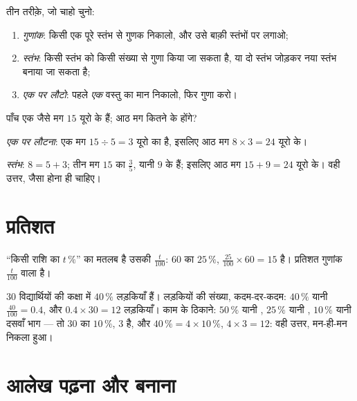\begin{method}[समानुपात की सारणी पूरी करना]\label{met:g6:propdata:complete}
तीन तरीक़े, जो चाहो चुनो:
\begin{enumerate}
  \item \emph{गुणांक}: किसी एक पूरे स्तंभ से गुणक निकालो, और उसे
        बाक़ी स्तंभों पर लगाओ;
  \item \emph{स्तंभ}: किसी स्तंभ को किसी संख्या से गुणा किया जा
        सकता है, या दो स्तंभ जोड़कर नया स्तंभ बनाया जा सकता है;
  \item \emph{एक पर लौटो}: पहले \emph{एक} वस्तु का मान निकालो,
        फिर गुणा करो।
\end{enumerate}
\end{method}

\begin{example}\label{ex:g6:propdata:methods}
पाँच एक जैसे मग $15$ यूरो के हैं; आठ मग कितने के होंगे?

\emph{एक पर लौटना}: एक मग $15 \div 5 = 3$ यूरो का है, इसलिए आठ
मग $8 \times 3 = 24$ यूरो के।

\emph{स्तंभ}: $8 = 5 + 3$; तीन मग $15$ का $\frac{3}{5}$, यानी
$9$ के हैं; इसलिए आठ मग $15 + 9 = 24$ यूरो के। वही उत्तर, जैसा
होना ही चाहिए।
\end{example}

\section{प्रतिशत}

\begin{definition}[प्रतिशत]\label{def:g6:propdata:percent}
``किसी राशि का $t\,\%$'' का मतलब है उसकी  $\frac{t}{100}$:
$60$ का $25\,\%$, $\frac{25}{100} \times 60 = 15$ है। प्रतिशत
गुणांक $\frac{t}{100}$ वाला  है।
\end{definition}

\begin{example}\label{ex:g6:propdata:percent}
$30$ विद्यार्थियों की कक्षा में $40\,\%$ लड़कियाँ हैं। लड़कियों की
संख्या, कदम-दर-कदम: $40\,\%$ यानी $\frac{40}{100} = 0.4$, और
$0.4 \times 30 = 12$ लड़कियाँ। काम के ठिकाने:
$50\,\%$ यानी , $25\,\%$ यानी , $10\,\%$ यानी दसवाँ भाग ---
तो $30$ का $10\,\%$, $3$ है, और $40\,\% = 4 \times 10\,\%$,
$4 \times 3 = 12$: वही उत्तर, मन-ही-मन निकला हुआ।
\end{example}

\section{आलेख पढ़ना और बनाना}

